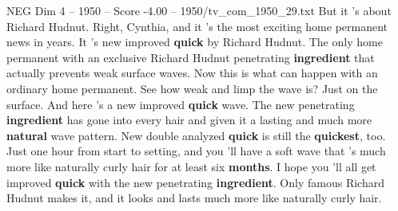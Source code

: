 \begin{textsample}{NEG Dim 4 – 1950 – Score -4.00 – 1950/tv\_com\_1950\_29.txt}  \label{ex:f4_neg_010}
But it 's about Richard Hudnut.
Right, Cynthia, and it 's the most exciting home permanent news in years.
It 's new improved \textbf{quick} by Richard Hudnut.
The only home permanent with an exclusive Richard Hudnut penetrating \textbf{ingredient} that actually prevents weak surface waves.
Now this is what can happen with an ordinary home permanent.
See how weak and limp the wave is?
Just on the surface.
And here 's a new improved \textbf{quick} wave.
The new penetrating \textbf{ingredient} has gone into every hair and given it a lasting and much more \textbf{natural} wave pattern.
New double analyzed \textbf{quick} is still the \textbf{quickest}, too.
Just one hour from start to setting, and you 'll have a soft wave that 's much more like naturally curly hair for at least six \textbf{months}.
I hope you 'll all get improved \textbf{quick} with the new penetrating \textbf{ingredient}.
Only famous Richard Hudnut makes it, and it looks and lasts much more like naturally curly hair.

\end{textsample}

